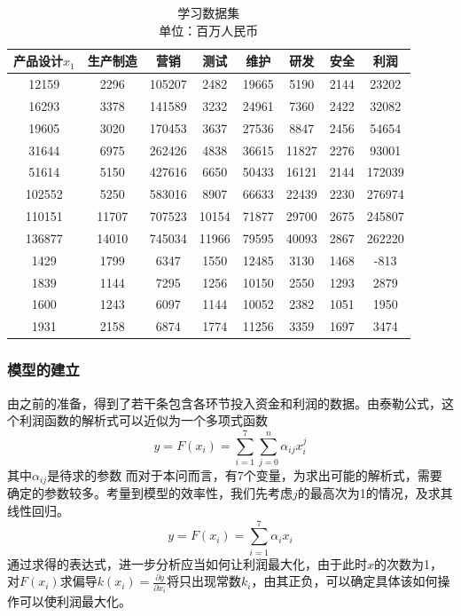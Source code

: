 \documentclass[12pt]{article}%
\begin{document}
\begin{table}[htbp]
  \centering
  \caption{学习数据集\\单位：百万人民币}
    \begin{tabular}{cccccccc}
\hline
    产品设计$x_1$ & 生产制造 & 营销 & 测试 & 维护 & 研发 & 安全 & 利润 \\
\hline
    12159  & 2296  & 105207  & 2482  & 19665  & 5190  & 2144  & 23202  \\
    16293  & 3378  & 141589  & 3232  & 24961  & 7360  & 2422  & 32082  \\
    19605  & 3020  & 170453  & 3637  & 27536  & 8847  & 2456  & 54654  \\
    31644  & 6975  & 262426  & 4838  & 36615  & 11827  & 2276  & 93001  \\
    51614  & 5150  & 427616  & 6650  & 50433  & 16121  & 2144  & 172039  \\
    102552  & 5250  & 583016  & 8907  & 66633  & 22439  & 2230  & 276974  \\
    110151  & 11707  & 707523  & 10154  & 71877  & 29700  & 2675  & 245807  \\
    136877  & 14010  & 745034  & 11966  & 79595  & 40093  & 2867  & 262220  \\
    1429 & 1799 & 6347 & 1550 & 12485 & 3130 & 1468 & -813 \\
    1839 & 1144 & 7295 & 1256 & 10150 & 2550 & 1293 & 2879 \\
    1600 & 1243 & 6097 & 1144 & 10052 & 2382 & 1051 & 1950 \\
    1931 & 2158 & 6874 & 1774 & 11256 & 3359 & 1697 & 3474 \\
\hline
    \end{tabular}%
  \label{tab:addlabel55}%
\end{table}%

\subsubsection{模型的建立}
由之前的准备，得到了若干条包含各环节投入资金和利润的数据。由泰勒公式，这个利润函数的解析式可以近似为一个多项式函数
\begin{equation}
y=F(x_i)=\sum_{i=1}^7\sum_{j=0}^n\alpha_{ij}x_i^j
\end{equation}
其中$\alpha_{ij}$是待求的参数
而对于本问而言，有7个变量，为求出可能的解析式，需要确定的参数较多。考量到模型的效率性，我们先考虑$j$的最高次为1的情况，及求其线性回归。
\begin{equation}
y=F(x_i)=\sum_{i=1}^7\alpha_ix_i
\end{equation}
通过求得的表达式，进一步分析应当如何让利润最大化，由于此时$x$的次数为1，对$F(x_i)求$偏导$k(x_i)=\frac{\partial y}{\partial x_i}$将只出现常数$k_i$，由其正负，可以确定具体该如何操作可以使利润最大化。
\end{document}
